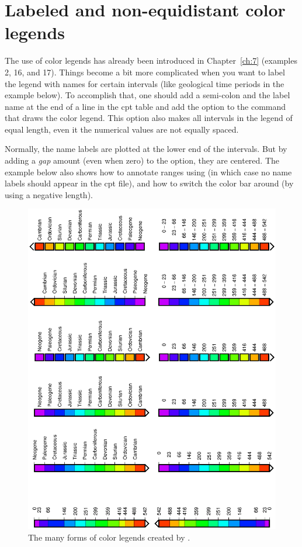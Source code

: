 \section{Labeled and non-equidistant color legends}
\label{app:colorbars}
The use of color legends has already been introduced in Chapter~\ref{ch:7} (examples 2, 16, and 17). Things become a bit more complicated when you want to label the legend with names for certain intervals (like geological time periods in the example below). To accomplish that, one should add a semi-colon and the label name at the end of a line in the cpt table and add the  option to the  command that draws the color legend. This option also makes all intervals in the legend of equal length, even it the numerical values are not equally spaced.

Normally, the name labels are plotted at the lower end of the intervals. But by adding a \emph{gap} amount (even when zero) to the  option, they are centered. The example below also shows how to annotate ranges using  (in which case no name labels should appear in the cpt file), and how to switch the color bar around (by using a negative length).


\begin{figure}[h]
\centering
\includegraphics[width=\textwidth]{scripts/GMT_App_M_2}
\caption{The many forms of color legends created by \protect{}.}
\label{fig:GMT_App_M_2}
\end{figure}
